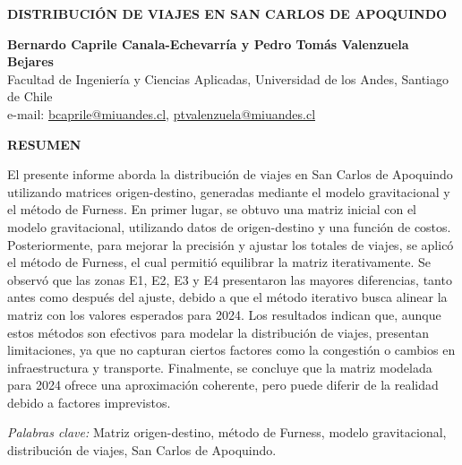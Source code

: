 \documentclass[letterpaper,12pt]{article}
\begin{document}
\begin{titlepage}
    \begin{center}
      \vspace*{1cm}

    \textbf{\Large DISTRIBUCIÓN DE VIAJES EN SAN CARLOS DE APOQUINDO}
    
    \vspace{1cm}
    
    \textbf{Bernardo Caprile Canala-Echevarría y Pedro Tomás Valenzuela Bejares}\\
    Facultad de Ingeniería y Ciencias Aplicadas, Universidad de los Andes, Santiago de Chile\\
    e-mail: \href{mailto:bcaprile@miuandes.cl}{bcaprile@miuandes.cl}, \href{mailto: ptvalenzuela@miuandes.cl}{ptvalenzuela@miuandes.cl}
    
    \vspace{2cm}
    
    \textbf{RESUMEN}
    
    El presente informe aborda la distribución de viajes en San Carlos de Apoquindo utilizando matrices origen-destino, generadas mediante el modelo gravitacional y el método de Furness. En primer lugar, se obtuvo una matriz inicial con el modelo gravitacional, utilizando datos de origen-destino y una función de costos. Posteriormente, para mejorar la precisión y ajustar los totales de viajes, se aplicó el método de Furness, el cual permitió equilibrar la matriz iterativamente. Se observó que las zonas E1, E2, E3 y E4 presentaron las mayores diferencias, tanto antes como después del ajuste, debido a que el método iterativo busca alinear la matriz con los valores esperados para 2024. Los resultados indican que, aunque estos métodos son efectivos para modelar la distribución de viajes, presentan limitaciones, ya que no capturan ciertos factores como la congestión o cambios en infraestructura y transporte. Finalmente, se concluye que la matriz modelada para 2024 ofrece una aproximación coherente, pero puede diferir de la realidad debido a factores imprevistos.

    \vspace{0.5cm}  
    \end{center}
    
    \textit{Palabras clave:} Matriz origen-destino, método de Furness, modelo gravitacional, distribución de viajes, San Carlos de Apoquindo.
\end{titlepage}

\newpage
\end{document}

